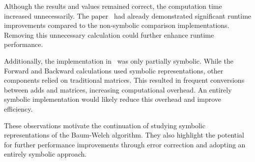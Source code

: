 Although the results and values remained correct, the computation time increased unnecessarily. 
The paper~\cite{p7} had already demonstrated significant runtime improvements compared to the non-symbolic comparison implementations. 
Removing this unnecessary calculation could further enhance runtime performance.

Additionally, the implementation in~\cite{p7} was only partially symbolic. While the Forward and Backward calculations used symbolic representations, other components relied on traditional matrices. 
This resulted in frequent conversions between \glspl{add} and matrices, increasing computational overhead. 
An entirely symbolic implementation would likely reduce this overhead and improve efficiency.

These observations motivate the continuation of studying symbolic representations of the Baum-Welch algorithm. 
They also highlight the potential for further performance improvements through error correction and adopting an entirely symbolic approach.

